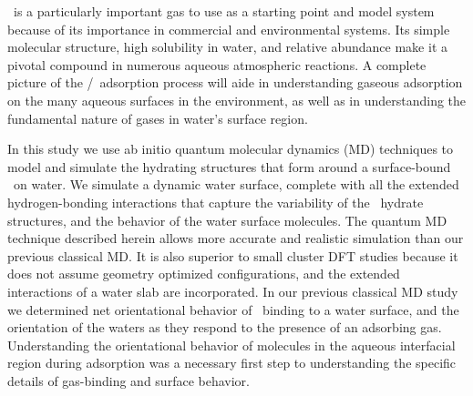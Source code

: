 \documentclass{article}
\begin{document}
\suldiox~is a particularly important gas to use as a starting point and model system because of its importance in commercial and environmental systems. \cite{Boniface2000,Jayne1990,Johns2011,Heber1997,Faloona2009,Clegg2001} Its simple molecular structure, high solubility in water, and relative abundance make it a pivotal compound in numerous aqueous atmospheric reactions. A complete picture of the \suldiox/\wat~adsorption process will aide in understanding gaseous adsorption on the many aqueous surfaces in the environment, as well as in understanding the fundamental nature of gases in water's surface region. 

In this study we use ab initio quantum molecular dynamics (MD) techniques to model and simulate the hydrating structures that form around a surface-bound \suldiox~on water. We simulate a dynamic water surface, complete with all the extended hydrogen-bonding interactions that capture the variability of the \suldiox~hydrate structures, and the behavior of the water surface molecules. The quantum MD technique described herein allows more accurate and realistic simulation than our previous classical MD.\cite{Shamay2011} It is also superior to small cluster DFT studies because it does not assume geometry optimized configurations, and the extended interactions of a water slab are incorporated. In our previous classical MD study we determined net orientational behavior of \suldiox~binding to a water surface, and the orientation of the waters as they respond to the presence of an adsorbing gas. Understanding the orientational behavior of molecules in the aqueous interfacial region during adsorption was a necessary first step to understanding the specific details of gas-binding and surface behavior. 

\end{document}
